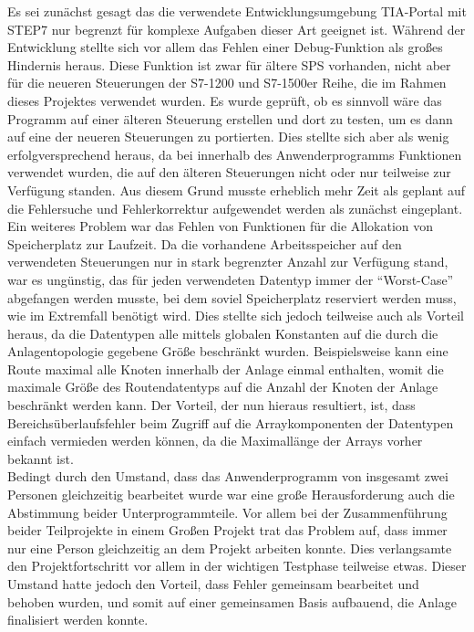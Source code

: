 		Es sei zunächst gesagt das die verwendete Entwicklungsumgebung \ac{TIA-Portal} mit \ac{STEP7} nur begrenzt für komplexe Aufgaben dieser Art geeignet ist. Während der Entwicklung stellte sich vor allem das Fehlen einer Debug-Funktion als großes Hindernis heraus. Diese Funktion ist zwar für ältere \ac{SPS} vorhanden, nicht aber für die neueren Steuerungen der S7-1200 und S7-1500er Reihe, die im Rahmen dieses Projektes verwendet wurden. Es wurde geprüft, ob es sinnvoll wäre das Programm auf einer älteren Steuerung erstellen und dort zu testen, um es dann auf eine der neueren Steuerungen zu portierten. Dies stellte sich aber als wenig erfolgversprechend heraus, da bei innerhalb des Anwenderprogramms Funktionen verwendet wurden, die auf den älteren Steuerungen nicht oder nur teilweise zur Verfügung standen. Aus diesem Grund musste erheblich mehr Zeit als geplant auf die Fehlersuche und Fehlerkorrektur aufgewendet werden als zunächst eingeplant.
		\\
		Ein weiteres Problem war das Fehlen von Funktionen für die Allokation von Speicherplatz zur Laufzeit. Da die vorhandene Arbeitsspeicher auf den verwendeten Steuerungen nur in stark begrenzter Anzahl zur Verfügung stand, war es ungünstig, das für jeden verwendeten  Datentyp immer der "`Worst-Case"' abgefangen werden musste, bei dem soviel Speicherplatz reserviert werden muss, wie im Extremfall benötigt wird. Dies stellte sich jedoch teilweise auch als Vorteil heraus, da die Datentypen alle mittels globalen Konstanten auf die durch die Anlagentopologie gegebene Größe beschränkt wurden. Beispielsweise kann eine Route maximal alle Knoten innerhalb der Anlage einmal enthalten, womit die maximale Größe des Routendatentyps auf die Anzahl der Knoten der Anlage beschränkt werden kann. Der Vorteil, der nun hieraus resultiert, ist, dass Bereichsüberlaufsfehler  beim Zugriff auf die Arraykomponenten der Datentypen einfach vermieden werden können, da die Maximallänge der Arrays vorher bekannt ist.
		\\
		Bedingt durch den Umstand, dass das Anwenderprogramm von insgesamt zwei Personen gleichzeitig bearbeitet wurde war eine große Herausforderung auch die Abstimmung beider Unterprogrammteile. Vor allem bei der Zusammenführung beider Teilprojekte in einem Großen Projekt trat das Problem auf, dass immer nur eine Person gleichzeitig an dem Projekt arbeiten konnte. Dies verlangsamte den Projektfortschritt vor allem in der wichtigen Testphase teilweise etwas. Dieser Umstand hatte jedoch den Vorteil, dass Fehler gemeinsam bearbeitet und behoben wurden, und somit auf einer gemeinsamen Basis aufbauend, die Anlage finalisiert werden konnte.
		
